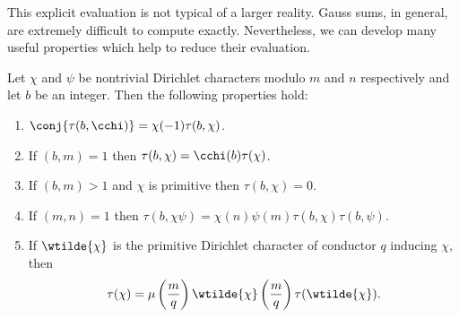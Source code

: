 \documentclass[12pt]{article}
\begin{document}
      This explicit evaluation is not typical of a larger reality. Gauss sums, in general, are extremely difficult to compute exactly. Nevertheless, we can develop many useful properties which help to reduce their evaluation.

      \begin{proposition}\label{prop:Gauss_sum_reduction}
        Let \(\chi\) and \(\psi\) be nontrivial Dirichlet characters modulo \(m\) and \(n\) respectively and let \(b\) be an integer. Then the following properties hold:
        \begin{enumerate}[label*=(\roman*)]
          \item \(\conj{\tau(b,\cchi)} = \chi(-1)\tau(b,\chi)\).
          \item If \((b,m) = 1\) then \(\tau(b,\chi) = \cchi(b)\tau(\chi)\).
          \item If \((b,m) > 1\) and \(\chi\) is primitive then \(\tau(b,\chi) = 0\).
          \item If \((m,n) = 1\) then \(\tau(b,\chi\psi) = \chi(n)\psi(m)\tau(b,\chi)\tau(b,\psi)\).
          \item If \(\wtilde{\chi}\) is the primitive Dirichlet character of conductor \(q\) inducing \(\chi\), then
          \[
            \tau(\chi) = \mu\left(\frac{m}{q}\right)\wtilde{\chi}\left(\frac{m}{q}\right)\tau(\wtilde{\chi}).
          \]
        \end{enumerate}
      \end{proposition}
\end{document}
